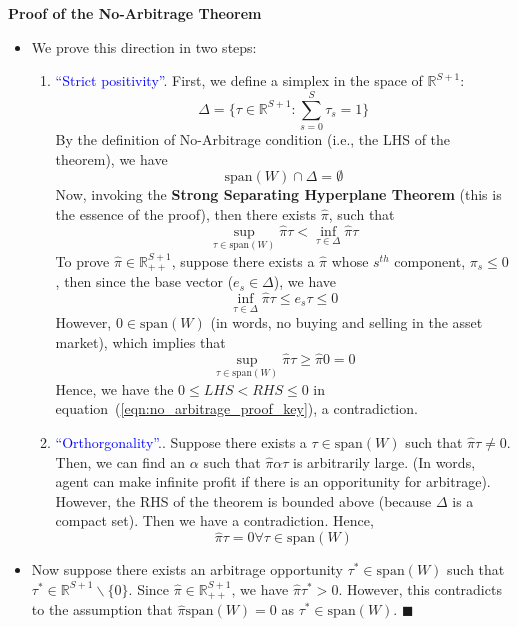 \noindent \textbf{Proof of the No-Arbitrage Theorem}
\begin{itemize}
  \item[($\Rightarrow$)]
  We prove this direction in two steps:
  \begin{enumerate}
    \item \textcolor{blue}{``Strict positivity''}.
    First, we define a simplex in the space of $\mathbb{R}^{S+1}$: 
    \[
    \Delta = \{\tau \in \mathbb{R}^{S+1}: \sum_{s=0}^S \tau_s = 1 \}
    \] 
    By the definition of No-Arbitrage condition (i.e., the LHS of the theorem), 
    we have
    \[
    \text{span}(W) \cap \Delta = \emptyset
    \]
    Now, invoking the \textbf{Strong Separating Hyperplane Theorem} (this is the essence of the proof),
    then there exists $\hat{\pi}$, such that
    \begin{equation}
      \label{eqn:no_arbitrage_proof_key}
      \sup_{\tau \in \text{span}(W)} \hat{\pi} \tau < 
      \inf_{\tau \in \Delta} \hat{\pi} \tau
    \end{equation}
    To prove $\hat{\pi} \in \mathbb{R}^{S+1}_{++}$, 
    suppose there exists a $\hat{\pi}$ whose $s^{th}$ component, $\pi_s \leq 0$, 
    then since the base vector ($e_s \in \Delta $), we have 
    $$\inf_{\tau \in \Delta} \hat{\pi} \tau \leq e_s \tau \leq 0 $$
    However, $0 \in \text{span}(W)$ (in words, no buying and selling in the asset market), 
    which implies that 
    \[
    \sup_{\tau \in \text{span}(W)} \hat{\pi} \tau \geq \hat{\pi} 0  = 0
    \]
    Hence, we have the $ 0 \leq LHS < RHS \leq 0$ in equation~(\ref{eqn:no_arbitrage_proof_key}), 
    a contradiction. 
  \item \textcolor{blue}{``Orthorgonality''}.. Suppose there exists a $\tau \in \text{span}(W)$ such that $\hat{\pi} \tau \neq 0$.
  Then, we can find an $\alpha$ such that $\hat{\pi} \alpha \tau$ is arbitrarily large.
  (In words, agent can make infinite profit if there is an opporitunity for arbitrage).
  However, the RHS of the theorem is bounded above (because $\Delta$ is a compact set).
  Then we have a contradiction. Hence, 
  \[
  \hat{\pi} \tau = 0 \forall \tau \in \text{span}(W)
  \]
  \end{enumerate}
  \item[($\Leftarrow$)] Now suppose there exists an arbitrage opportunity $\tau^* \in \text{span}(W)$ such that 
  $\tau^* \in \mathbb{R}^{S+1} \backslash \{0 \}$.
  Since $\hat{\pi} \in  \mathbb{R}^{S+1}_{++}$, we have $\hat{\pi} \tau^* > 0$.
  However, this contradicts to the assumption that 
  $\hat{\pi} \text{span}(W) = 0$ as $\tau^* \in \text{span}(W)$. \(\blacksquare\)
\end{itemize}











